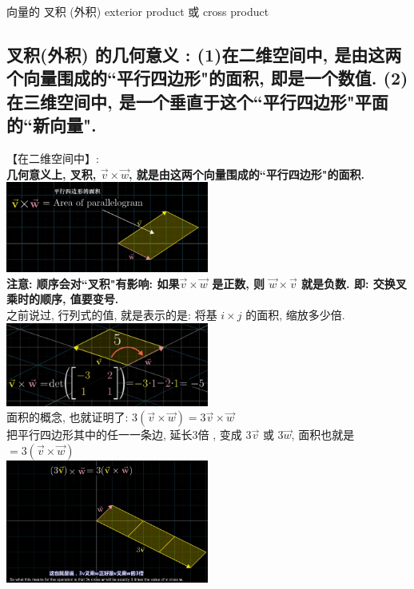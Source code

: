 \documentclass[UTF8]{ctexart}
\begin{document}
向量的 叉积 (外积) exterior product 或  cross product



\subsection{叉积(外积) 的几何意义 : (1)在二维空间中, 是由这两个向量围成的``平行四边形"的面积, 即是一个数值. (2)在三维空间中, 是一个垂直于这个``平行四边形"平面的``新向量".}

【在二维空间中】: \\

\textbf{几何意义上, 叉积, $\vec{v} \times \vec{w}$, 就是由这两个向量围成的``平行四边形"的面积.} \\
\includegraphics[width=0.5\textwidth]{img/0073.png}\\

\textbf{注意: 顺序会对``叉积"有影响: 如果$\vec{v} \times \vec{w}$ 是正数, 则 $\vec{w} \times \vec{v}$ 就是负数. 即: 交换叉乘时的顺序, 值要变号.} \\

之前说过, 行列式的值, 就是表示的是: 将基 $i \times j$ 的面积, 缩放多少倍.\\
\includegraphics[width=0.5\textwidth]{img/0074.png}\\

面积的概念, 也就证明了: $3(\vec{v} \times \vec{w}) = 3 \vec{v} \times \vec{w}$\\
把平行四边形其中的任一一条边, 延长3倍 , 变成 $3 \vec{v}$ 或  $3 \vec{w}$, 面积也就是 $= 3 (\vec{v} \times \vec{w})$ \\
\includegraphics[width=0.5\textwidth]{img/0075.png}\\
\end{document}
